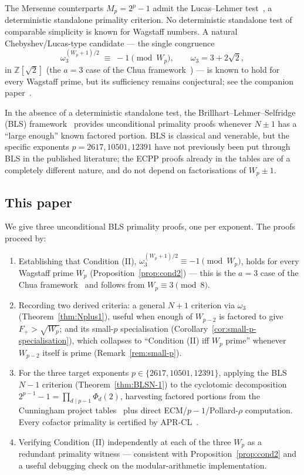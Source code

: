 \documentclass[11pt,a4paper]{amsart}
\theoremstyle{plain}
\theoremstyle{definition}
\newcommand{\Z}{\mathbb{Z}}
\newcommand{\wom}{\omega_3}
\newcommand{\Wp}{W_p}
\newcommand{\sqrttwo}{\sqrt{2}}
\begin{document}
The Mersenne counterparts $M_p = 2^p - 1$ admit the Lucas--Lehmer
test~\cite{Lehmer}, a deterministic standalone primality criterion. No
deterministic standalone test of comparable simplicity is known for
Wagstaff numbers. A natural Chebyshev/Lucas-type candidate --- the
single congruence
\begin{equation*}
  \wom^{(W_p + 1)/2} \;\equiv\; -1 \pmod{\Wp}, \qquad \wom = 3 + 2\sqrttwo,
\end{equation*}
in $\Z[\sqrttwo]$ (the $a = 3$ case of the Chua
framework~\cite{Chua}) --- is known to hold for every Wagstaff prime,
but its sufficiency remains conjectural; see the companion
paper~\cite{PaperB}.

In the absence of a deterministic standalone test, the
Brillhart--Lehmer--Selfridge (BLS) framework~\cite{BLS75} provides
unconditional primality proofs whenever $N \pm 1$ has a ``large
enough'' known factored portion. BLS is classical and venerable, but
the specific exponents $p = 2617, 10501, 12391$ have not previously
been put through BLS in the published literature; the ECPP proofs
already in the tables are of a completely different nature, and do not
depend on factorisations of $W_p \pm 1$.

\subsection{This paper}

We give three unconditional BLS primality proofs, one per exponent.
The proofs proceed by:
\begin{enumerate}
\item Establishing that Condition (II),
  $\wom^{(W_p+1)/2} \equiv -1 \pmod{W_p}$, holds for every Wagstaff
  prime $W_p$ (Proposition~\ref{prop:cond2}) --- this is the
  $a = 3$ case of the Chua framework~\cite{Chua} and follows from
  $W_p \equiv 3 \pmod{8}$.
\item Recording two derived criteria: a general $N+1$ criterion via
  $\wom$ (Theorem~\ref{thm:Nplus1}), useful when enough of $W_{p-2}$ is
  factored to give $F_+ > \sqrt{W_p}$; and its small-$p$ specialisation
  (Corollary~\ref{cor:small-p-specialisation}), which collapses to
  ``Condition (II) iff $W_p$ prime'' whenever $W_{p-2}$ itself is prime
  (Remark~\ref{rem:small-p}).
\item For the three target exponents $p \in \{2617, 10501, 12391\}$,
  applying the BLS $N - 1$ criterion (Theorem~\ref{thm:BLSN-1}) to the
  cyclotomic decomposition $2^{p-1} - 1 = \prod_{d \mid p - 1}
  \Phi_d(2)$, harvesting factored portions from the Cunningham project
  tables~\cite{Cunningham} plus direct ECM/$p{-}1$/Pollard-$\rho$
  computation. Every cofactor primality is certified by
  APR-CL~\cite{APR,CohenLenstra}.
\item Verifying Condition (II) independently at each of the three
  $W_p$ as a redundant primality witness --- consistent with
  Proposition~\ref{prop:cond2} and a useful debugging check on the
  modular-arithmetic implementation.
\end{enumerate}
\end{document}
